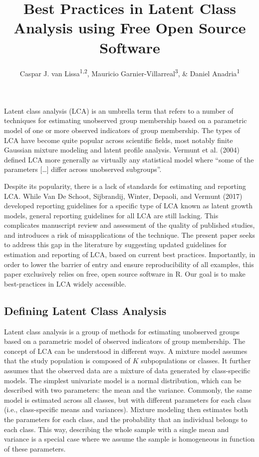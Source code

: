 \documentclass[
  ,man,floatsintext]{apa6}
\title{Best Practices in Latent Class Analysis using Free Open Source Software}
\author{Caspar J. van Lissa\textsuperscript{1,2}, Mauricio Garnier-Villarreal\textsuperscript{3}, \& Daniel Anadria\textsuperscript{1}}
\date{}
\affiliation{\vspace{0.5cm}\textsuperscript{1} Utrecht University, Methodology \& Statistics\\\textsuperscript{2} Open Science Community Utrecht\\\textsuperscript{3} Vrije Universiteit Amsterdam, Sociology}
\begin{document}
\maketitle

Latent class analysis (LCA) is an umbrella term that refers to a number
of techniques for estimating unobserved group membership based on a
parametric model of one or more observed indicators of group membership.
The types of LCA have become quite popular across scientific fields,
most notably finite Gaussian mixture modeling and latent profile
analysis. Vermunt et al. (2004) defined LCA more generally as
virtually any statistical model where ``some of the parameters {[}\ldots{]}
differ across unobserved subgroups''.

Despite its popularity, there is a lack of standards for estimating and
reporting LCA. While Van De Schoot, Sijbrandij, Winter, Depaoli, and Vermunt (2017) developed
reporting guidelines for a specific type of LCA known as latent growth
models, general reporting guidelines for all LCA are still lacking. This
complicates manuscript review and assessment of the quality of published
studies, and introduces a risk of misapplications of the technique. The
present paper seeks to address this gap in the literature by suggesting
updated guidelines for estimation and reporting of LCA, based on current
best practices. Importantly, in order to lower the barrier of entry and
ensure reproducibility of all examples, this paper exclusively relies on
free, open source software in R. Our goal is to make best-practices in
LCA widely accessible.

\hypertarget{defining-latent-class-analysis}{%
\subsection{Defining Latent Class Analysis}\label{defining-latent-class-analysis}}

Latent class analysis is a group of methods for estimating unobserved
groups based on a parametric model of observed indicators of group
membership. The concept of LCA can be understood in different ways. A
mixture model assumes that the study population is composed of \(K\)
subpopulations or classes. It further assumes that the observed data are
a mixture of data generated by class-specific models. The simplest
univariate model is a normal distribution, which can be described with
two parameters: the mean and the variance. Commonly, the same model is
estimated across all classes, but with different parameters for each
class (i.e., class-specific means and variances). Mixture modeling then
estimates both the parameters for each class, and the probability that
an individual belongs to each class. This way, describing the whole
sample with a single mean and variance is a special case where we assume
the sample is homogeneous in function of these parameters.
\end{document}
